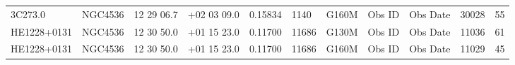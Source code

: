 \documentclass[iop]{emulateapj-rtx4}
\begin{document}
\begin{table}[ht]
\begin{center}
\begin{tabular}{l l l l l l l l l l c}
3C273.0  					&      NGC4536  		&      12  29  06.7  		&	+02  03  09.0 	&   0.15834  	& 1140		&   G160M	&   Obs ID  & Obs Date  & 30028  &      55         \\
HE1228+0131  				&      NGC4536  		&      12  30  50.0  		&	+01  15  23.0  	&   0.11700  	& 11686		&   G130M 	&   Obs ID  & Obs Date  & 11036  &      61          \\
HE1228+0131  				&      NGC4536  		&      12  30  50.0  		&	+01  15  23.0  	&   0.11700  	& 11686		&   G160M	&   Obs ID  & Obs Date  & 11029  &      45          \\

\end{tabular}
\end{center}
\end{table}
\end{document}
